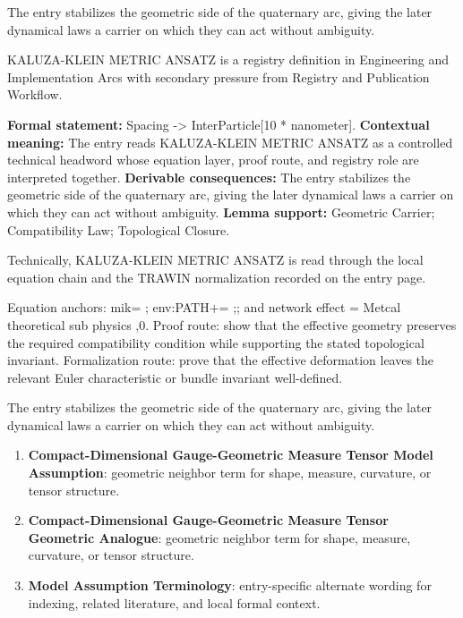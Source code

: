 The entry stabilizes the geometric side of the quaternary arc, giving the later dynamical laws a carrier on which they can act without ambiguity.
\clearpage


\begingroup\small
{}
KALUZA-KLEIN METRIC ANSATZ is a registry definition in Engineering and Implementation Arcs with secondary pressure from Registry and Publication Workflow.

\begingroup\footnotesize\setlength{\emergencystretch}{3em}\sloppy
\textbf{Formal statement:} Spacing -> InterParticle[10 * nanometer]. \textbf{Contextual meaning:} The entry reads KALUZA-KLEIN METRIC ANSATZ as a controlled technical headword whose equation layer, proof route, and registry role are interpreted together. \textbf{Derivable consequences:} The entry stabilizes the geometric side of the quaternary arc, giving the later dynamical laws a carrier on which they can act without ambiguity. \textbf{Lemma support:} Geometric Carrier; Compatibility Law; Topological Closure.\par
\endgroup

Technically, KALUZA-KLEIN METRIC ANSATZ is read through the local equation chain and the TRAWIN normalization recorded on the entry page.

Equation anchors: mik= ; env:PATH+= ;; and network effect = Metcal theoretical sub physics ,0. Proof route: show that the effective geometry preserves the required compatibility condition while supporting the stated topological invariant. Formalization route: prove that the effective deformation leaves the relevant Euler characteristic or bundle invariant well-defined.

The entry stabilizes the geometric side of the quaternary arc, giving the later dynamical laws a carrier on which they can act without ambiguity.
\endgroup

\begin{enumerate}[leftmargin=1.6em,itemsep=6pt,topsep=4pt]
\item \textbf{Compact-Dimensional Gauge-Geometric Measure Tensor Model Assumption}: geometric neighbor term for shape, measure, curvature, or tensor structure.
\item \textbf{Compact-Dimensional Gauge-Geometric Measure Tensor Geometric Analogue}: geometric neighbor term for shape, measure, curvature, or tensor structure.
\item \textbf{Model Assumption Terminology}: entry-specific alternate wording for indexing, related literature, and local formal context.
\end{enumerate}

